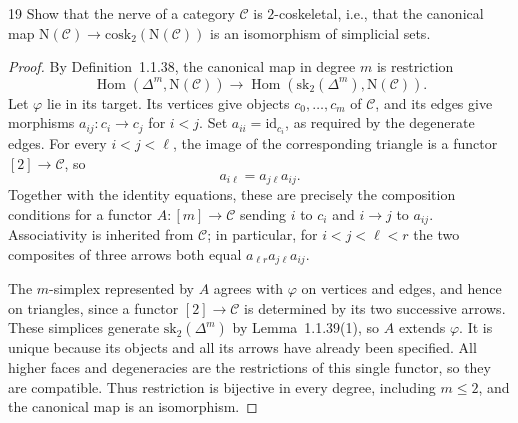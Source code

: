 \begin{exercise}{19}
Show that the nerve of a category $\mathcal C$ is $2$-coskeletal,
i.e., that the canonical map
$\mathrm N(\mathcal C)\to\mathrm{cosk}_2(\mathrm N(\mathcal C))$
is an isomorphism of simplicial sets.

\begin{proof}
By Definition~1.1.38, the canonical map in degree $m$ is restriction
\[
 \operatorname{Hom}(\Delta^m,\mathrm N(\mathcal C))
 \longrightarrow
 \operatorname{Hom}(\mathrm{sk}_2(\Delta^m),\mathrm N(\mathcal C)).
\]
Let $\varphi$ lie in its target. Its vertices give objects
$c_0,\ldots,c_m$ of $\mathcal C$, and its edges give morphisms
$a_{ij}\colon c_i\to c_j$ for $i<j$. Set
$a_{ii}=\mathrm{id}_{c_i}$, as required by the degenerate edges.
For every $i<j<\ell$, the image of the corresponding triangle is
a functor $[2]\to\mathcal C$, so
\[
 a_{i\ell}=a_{j\ell}a_{ij}.
\]
Together with the identity equations, these are precisely the
composition conditions for a functor $A\colon[m]\to\mathcal C$
sending $i$ to $c_i$ and $i\to j$ to $a_{ij}$.
Associativity is inherited from $\mathcal C$; in particular, for
$i<j<\ell<r$ the two composites of three arrows both equal
$a_{\ell r}a_{j\ell}a_{ij}$.

The $m$-simplex represented by $A$ agrees with $\varphi$ on vertices
and edges, and hence on triangles, since a functor $[2]\to\mathcal C$
is determined by its two successive arrows. These simplices generate
$\mathrm{sk}_2(\Delta^m)$ by Lemma~1.1.39(1), so $A$ extends
$\varphi$. It is unique because its objects and all its arrows
have already been specified. All higher faces and degeneracies are
the restrictions of this single functor, so they are compatible.
Thus restriction is bijective in every degree, including $m\le2$,
and the canonical map is an isomorphism.
\end{proof}
\end{exercise}
